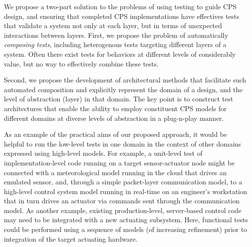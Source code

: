 We propose a two-part solution to the problems of using testing to guide CPS design, and ensuring that completed CPS implementations have effectives tests that validate a system not only at each layer, but in terms of unexpected interactions between layers.  First, we propose the problem of automatically \emph{composing tests}, including heterogenous tests targeting different layers of a system.  Often there exist tests for behaviors at different levels of considerably value, but no way to effectively combine these tests.

Second, we propose the development of architectural methods that facilitate such automated composition and explicitly represent the domain of a design, and the level of abstraction (layer) in that domain.  The key point is to construct test architectures  that enable the ability to employ constituent CPS models for different domains at diverse levels of abstraction in a plug-n-play manner.

As an example of the practical aims of our proposed approach, it would be helpful to run the low-level tests in one domain in the context of other domains expressed using high-level models. For example, a unit-level test of implementation-level code running on a target sensor-actuator node might be connected with a meteorological model running in the cloud that drives an emulated sensor, and, through a simple packet-layer communication model, to a high-level control system model running in real-time on an engineer's workstation that in turn drives an actuator via commands sent through the communication model. As another example, existing production-level, server-based control code may need to be integrated with a new actuating subsystem. Here, functional tests could be performed using a sequence of models (of increasing refinement) prior to integration of the target actuating hardware.
